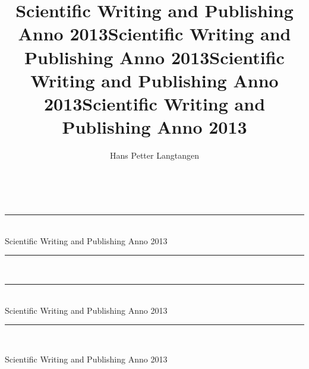 \documentclass[%
twoside,                 %
draft,                   %
final,                   %
chapterprefix=true,      %
open=right               %
10pt]{book}
\begin{document}








\title{{\color{seccolor} Scientific Writing and Publishing Anno 2013}}
\title{Scientific Writing and Publishing Anno 2013}


\thispagestyle{empty}
\hbox{\ \ }
\vfill
\begin{center}
{\huge{\bfseries{
\begin{spacing}{1.25}
{\color{seccolor}\rule{\linewidth}{0.5mm}} \\[0.4cm]
{\color{seccolor}Scientific Writing and Publishing Anno 2013}
\\[0.4cm] {\color{seccolor}\rule{\linewidth}{0.5mm}} \\[1.5cm]
{\rule{\linewidth}{0.5mm}} \\[0.4cm]
{Scientific Writing and Publishing Anno 2013}
\\[0.4cm] {\rule{\linewidth}{0.5mm}} \\[1.5cm]
\end{spacing}
}}}

\title*{Scientific Writing and Publishing Anno 2013}

\title{Scientific Writing and Publishing Anno 2013}
\thispagestyle{empty}

\begin{center}
{\LARGE\bf
\begin{spacing}{1.25}
Scientific Writing and Publishing Anno 2013
\end{spacing}
}
\end{center}

\author{Hans Petter Langtangen}

\vspace{1.3cm}


\end{center}
\end{document}
